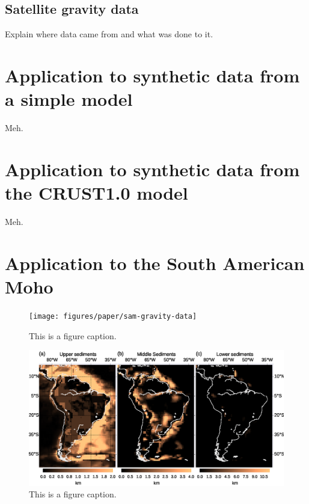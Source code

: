 \documentclass[extra]{gji}
\begin{document}

\subsection{Satellite gravity data}


Explain where data came from and what was done to  it.


\section{Application to synthetic data from a simple model}


Meh.


\section{Application to synthetic data from the CRUST1.0 model}

Meh.


\section{Application to the South American Moho}

\begin{figure}
    \centering
    \texttt{[image: figures/paper/sam-gravity-data]}
    \caption{This is a figure caption.}
    \label{fig:sam-data}
\end{figure}

\begin{figure}
    \centering
    \includegraphics[width=\textwidth]{figures/paper/sam-gravity-sed}
    \caption{This is a figure caption.}
    \label{fig:sam-sed}
\end{figure}
\end{document}
